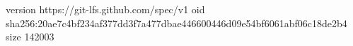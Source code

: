 version https://git-lfs.github.com/spec/v1
oid sha256:20ae7c4bf234af377dd3f7a477dbae446600446d09e54bf6061abf06c18de2b4
size 142003
